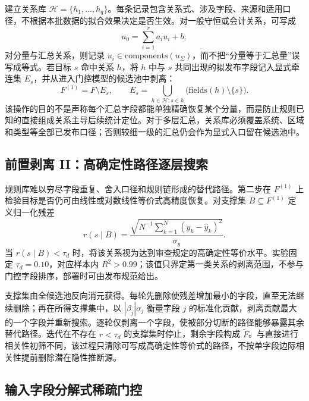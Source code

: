 \documentclass[UTF8,zihao=5,twoside,fontset=none]{ctexart}
\begin{document}
建立关系库 $\mathcal H=\{h_1,\ldots,h_q\}$。每条记录包含关系式、涉及字段、来源和适用口径，不根据本批数据的拟合效果决定是否生效。对一般守恒或会计关系，可写成
\begin{equation}
u_0=\sum_{i=1}^{r}a_i u_i+b;
\end{equation}
对分量与汇总关系，则记录 $u_i\in\mathrm{components}(u_\Sigma)$，而不把“分量等于汇总量”误写成等式。若目标 $s$ 命中关系 $h$，将 $h$ 中与 $s$ 共同出现的拟发布字段记入显式牵连集 $E_s$，并从进入门控模型的候选池中剥离：
\begin{equation}
F^{(1)}=F\setminus E_s,\qquad
E_s=\bigcup_{h\in\mathcal H:s\in h}\big(\mathrm{fields}(h)\setminus\{s\}\big).
\end{equation}
该操作的目的不是声称每个汇总字段都能单独精确恢复某个分量，而是防止规则已知的直接组成关系主导后续统计定位。对于多层汇总，关系库必须覆盖系统、区域和类型等全部已发布口径；否则较细一级的汇总仍会作为显式入口留在候选池中。

\subsection{前置剥离 II：高确定性路径逐层搜索}

规则库难以穷尽字段重复、舍入口径和规则链形成的替代路径。第二步在 $F^{(1)}$ 上检验目标是否仍可由线性或对数线性等价式高精度恢复。对支撑集 $B\subseteq F^{(1)}$ 定义归一化残差
\begin{equation}
r(s\mid B)=\frac{\sqrt{N^{-1}\sum_{k=1}^{N}(y_k-\hat y_k)^2}}{\sigma_y}.
\end{equation}
当 $r(s\mid B)<\tau_d$ 时，将该关系视为达到审查规定的高确定性等价水平。实验固定 $\tau_d=0.10$，对应样本内 $R^2>0.99$；该值只界定第一类关系的剥离范围，不参与门控字段排序，部署时可由发布规范给出。

支撑集由全候选池反向消元获得。每轮先删除使残差增加最小的字段，直至无法继续删除；再在所得支撑集中，以 $|\beta_j|\sigma_j$ 衡量字段 $j$ 的标准化贡献，剥离贡献最大的一个字段并重新搜索。逐轮仅剥离一个字段，使被部分切断的路径能够暴露其余替代路径。迭代在不存在 $r<\tau_d$ 的支撑集时停止，剩余字段构成 $\widetilde F$。与直接进行相关性初筛不同，该过程只清除可写成高确定性等价式的路径，不按单字段边际相关性提前删除潜在隐性推断源。

\subsection{输入字段分解式稀疏门控}
\end{document}

